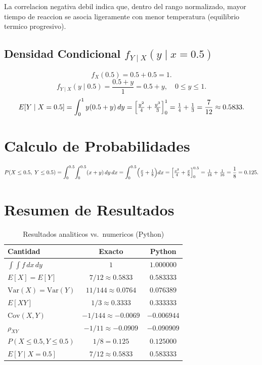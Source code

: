 \documentclass[12pt,a4paper]{article}
\begin{document}
La correlacion negativa debil indica que, dentro del rango normalizado,
mayor tiempo de reaccion se asocia ligeramente con menor temperatura
(equilibrio termico progresivo).

\subsection{Densidad Condicional $f_{Y\mid X}(y\mid x=0.5)$}

\[
  f_X(0.5)=0.5+0.5=1.
\]
\[
  f_{Y\mid X}(y\mid 0.5)=\frac{0.5+y}{1}=0.5+y,\quad 0\leq y\leq 1.
\]
\[
  E[Y\mid X=0.5]=\int_0^1 y(0.5+y)\,dy
                =\Bigl[\tfrac{y^2}{4}+\tfrac{y^3}{3}\Bigr]_0^1
                =\tfrac{1}{4}+\tfrac{1}{3}=\frac{7}{12}\approx 0.5833.
\]

\section{Calculo de Probabilidades}

\[
  P(X\leq 0.5,\;Y\leq 0.5)
  =\int_0^{0.5}\!\int_0^{0.5}(x+y)\,dy\,dx
  =\int_0^{0.5}\Bigl(\tfrac{x}{2}+\tfrac{1}{8}\Bigr)dx
  =\Bigl[\tfrac{x^2}{4}+\tfrac{x}{8}\Bigr]_0^{0.5}
  =\tfrac{1}{16}+\tfrac{1}{16}=\frac{1}{8}=0.125.
\]

\section{Resumen de Resultados}

\begin{table}[H]
\centering
\caption{Resultados analiticos vs.\ numericos (Python)}
\renewcommand{\arraystretch}{1.4}
\begin{tabular}{lcc}
\toprule
\textbf{Cantidad} & \textbf{Exacto} & \textbf{Python} \\
\midrule
$\int\!\!\int f\,dx\,dy$                     & $1$                     & $1.000000$ \\
$E[X]=E[Y]$                                  & $7/12 \approx 0.5833$   & $0.583333$ \\
$\mathrm{Var}(X)=\mathrm{Var}(Y)$           & $11/144\approx 0.0764$  & $0.076389$ \\
$E[XY]$                                      & $1/3\approx 0.3333$     & $0.333333$ \\
$\mathrm{Cov}(X,Y)$                         & $-1/144\approx -0.0069$ & $-0.006944$\\
$\rho_{XY}$                                  & $-1/11\approx -0.0909$  & $-0.090909$\\
$P(X\leq 0.5,Y\leq 0.5)$                   & $1/8 = 0.125$           & $0.125000$ \\
$E[Y\mid X=0.5]$                            & $7/12\approx 0.5833$    & $0.583333$ \\
\bottomrule
\end{tabular}
\end{table}
\end{document}
